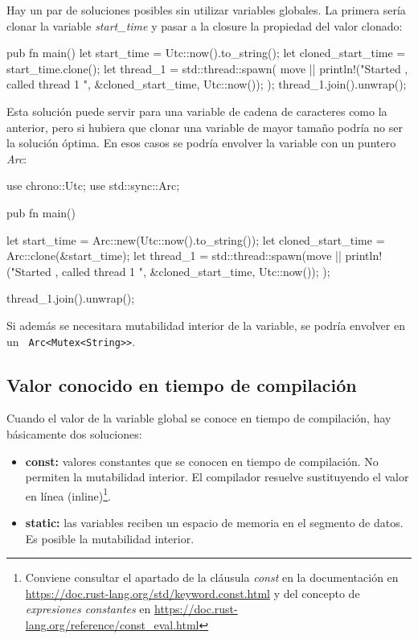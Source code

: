Hay un par de soluciones posibles sin utilizar variables globales. La primera sería clonar la variable \textit{start\_time} y pasar a la closure la propiedad del valor clonado:

\begin{Codigo}
   pub fn main() {
      let start_time = Utc::now().to_string();
      let cloned_start_time = start_time.clone();
      let thread_1 = std::thread::spawn( move ||{
         println!("Started {}, called thread 1 {}", &cloned_start_time, Utc::now());
      });
      thread_1.join().unwrap();
   }	
\end{Codigo}

Esta solución puede servir para una variable de cadena de caracteres como la anterior, pero si hubiera que clonar una variable de mayor tamaño podría no ser la solución óptima. En esos casos se podría envolver la variable con un puntero \textit{Arc}:



\begin{Codigo}
   use chrono::Utc;
   use std::sync::Arc;
   
   pub fn main() {
      let start_time = Arc::new(Utc::now().to_string());
      let cloned_start_time = Arc::clone(&start_time);
      let thread_1 = std::thread::spawn(move ||{
         println!("Started {}, called thread 1 {}", &cloned_start_time, Utc::now());
      });
      
      thread_1.join().unwrap();
   }
\end{Codigo}

Si además se necesitara mutabilidad interior de la variable, se podría envolver en un \verb+ Arc<Mutex<String>>+.

\subsection{Valor conocido en tiempo de compilación}
Cuando el valor de la variable global se conoce en tiempo de compilación, hay básicamente dos soluciones:
\begin{itemize}
   \item \textbf{const:} valores constantes que se conocen en tiempo de compilación. No permiten la mutabilidad interior. El compilador resuelve sustituyendo el valor en línea (inline)\footnote{Conviene consultar el apartado de la cláusula \textit{const} en la documentación en  \url{https://doc.rust-lang.org/std/keyword.const.html} y del concepto de \textit{expresiones constantes} en \url{https://doc.rust-lang.org/reference/const_eval.html}}. 
   \item \textbf{static:} las variables reciben un espacio de memoria en el segmento de datos. Es posible la mutabilidad interior.
\end{itemize}

